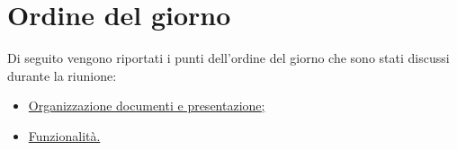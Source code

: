 \clearpage
\section{Ordine del giorno}
Di seguito vengono riportati i punti dell’ordine del giorno che sono stati discussi durante la riunione:
\begin{itemize}
	\item \hyperref[sec:organizzazione]{Organizzazione documenti e presentazione;}
	\item \hyperref[sec:funzionalità]{Funzionalità.}
\end{itemize}